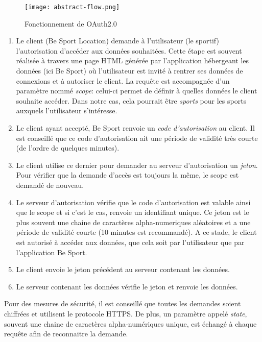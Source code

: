 \begin{figure}
  \centering
  \texttt{[image: abstract-flow.png]}
  \caption{Fonctionnement de OAuth2.0}
  \label{fig:abstract-flow-oauth2-0}
\end{figure}

\begin{enumerate}
  \item Le client (Be Sport Location) demande à l'utilisateur (le sportif)
    l'autorisation d'accéder aux données souhaitées. Cette étape est souvent
    réalisée à travers une page HTML générée par l'application hébergeant les
    données (ici Be Sport) où l'utilisateur est invité à rentrer ses données de
    connexions et à autoriser le client.
    La requête est accompagnée d'un paramètre nommé \emph{scope}: celui-ci
    permet de définir à quelles données le client souhaite accéder. Dans notre
    cas, cela pourrait être \emph{sports} pour les sports auxquels l'utilisateur
    s'intéresse.
  \item Le client ayant accepté, Be Sport renvoie un \emph{code d'autorisation}
au client. Il est conseillé que ce code d'autorisation ait une période de
validité très courte (de l'ordre de quelques minutes).
  \item Le client utilise ce dernier pour demander au serveur d'autorisation un
    \emph{jeton}. Pour vérifier que la demande d'accès est
    toujours la même, le scope est demandé de nouveau. 
  \item Le serveur d'autorisation vérifie que le code d'autorisation est valable
    ainsi que le scope et si c'est le cas, renvoie un identifiant unique. Ce
    jeton est le plus souvent une chaine de caractères
    alpha-numeriques aléatoires et a une période de validité courte (10 minutes est
    recommandé). A ce stade, le client est autorisé à accéder aux données, que
    cela soit par l'utilisateur que par l'application Be Sport.
  \item Le client envoie le jeton précédent au serveur contenant les données.
  \item Le serveur contenant les données vérifie le jeton et renvoie les données.
\end{enumerate}

Pour des mesures de sécurité, il est conseillé que toutes les demandes soient
chiffrées et utilisent le protocole HTTPS. De plus, un paramètre appelé
\emph{state}, souvent une chaine de caractères alpha-numériques unique, est
échangé à chaque requête afin de reconnaitre la demande. 

